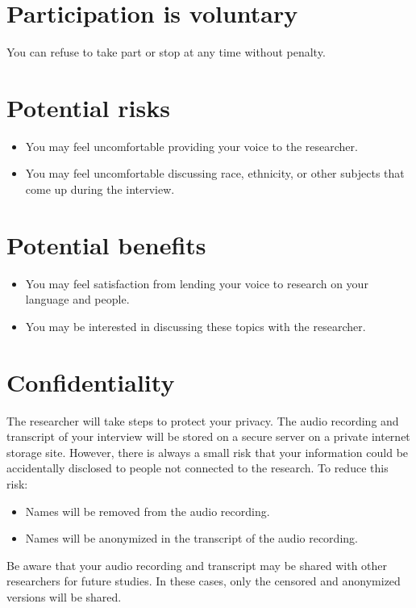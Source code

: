 \documentclass{article}
\begin{document}
    \section{Participation is voluntary}
      You can refuse to take part or stop at any time without penalty.

    \section{Potential risks}
       \begin{itemize}
         \item You may feel uncomfortable providing your voice to the researcher.
         \item You may feel uncomfortable discussing race, ethnicity, or other subjects that come up during the interview.
       \end{itemize}

    \section{Potential benefits}
      \begin{itemize}
        \item You may feel satisfaction from lending your voice to research on your language and people.
        \item You may be interested in discussing these topics with the researcher.
      \end{itemize}

    \section{Confidentiality}
      The researcher will take steps to protect your privacy.
      The audio recording and transcript of your interview will be stored on a secure server on a private internet storage site. However, there is always a small risk that your information could be accidentally disclosed to people not connected to the research.
      To reduce this risk:
      \begin{itemize}
        \item Names will be removed from the audio recording.
        \item Names will be anonymized in the transcript of the audio recording.
      \end{itemize}
      Be aware that your audio recording and transcript may be shared with other researchers for future studies.
      In these cases, only the censored and anonymized versions will be shared.
\end{document}
